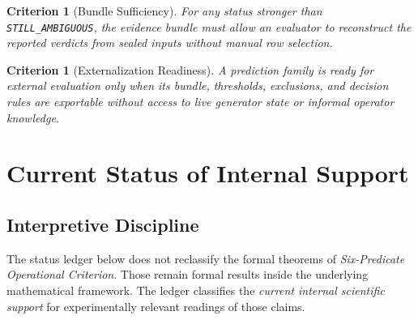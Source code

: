 \documentclass[11pt,a4paper]{article}
\newtheorem{criterion}[proposition]{Criterion}
\newcommand{\Status}[1]{\texttt{#1}}
\begin{document}
\begin{criterion}[Bundle Sufficiency]
For any status stronger than \Status{STILL\_AMBIGUOUS}, the evidence bundle must
allow an evaluator to reconstruct the reported verdicts from sealed inputs without
manual row selection.
\end{criterion}

\begin{criterion}[Externalization Readiness]
A prediction family is ready for external evaluation only when its bundle,
thresholds, exclusions, and decision rules are exportable without access to live
generator state or informal operator knowledge.
\end{criterion}

\section{Current Status of Internal Support}
\subsection{Interpretive Discipline}
The status ledger below does not reclassify the formal theorems of \textit{Six-Predicate Operational Criterion}. Those remain formal results inside the underlying mathematical framework. The ledger classifies the \emph{current internal scientific support} for experimentally relevant readings of those claims.
\end{document}
